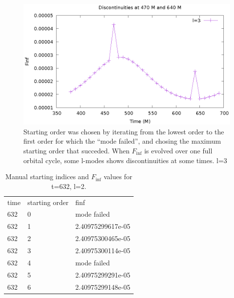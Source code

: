 \begin{figure}
  \includegraphics{finfovertimel3discontinuities}
  \caption{Starting order was chosen by iterating from the lowest order to the first order for which the ``mode failed'', and chosing the maximum starting order that succeded. When $F_{\inf}$ is evolved over one full orbital cycle, some l-modes shows discontinuities at some times. l=3}
\end{figure}




\begin{table}
  \begin{tabular}{lll}
    time & starting order & finf\\
    632 & 0 & mode failed\\
    632 & 1 & 2.40975299617e-05\\
    632 & 2 & 2.40975300465e-05\\
    632 & 3 & 2.40975300114e-05\\
    632 & 4 & mode failed\\
    632 & 5 & 2.40975299291e-05\\
    632 & 6 & 2.40975299148e-05\\
  \end{tabular}
  \caption{Manual starting indices and $F_{\inf}$ values for t=632, l=2.}
  \label{manual}
\end{table}

